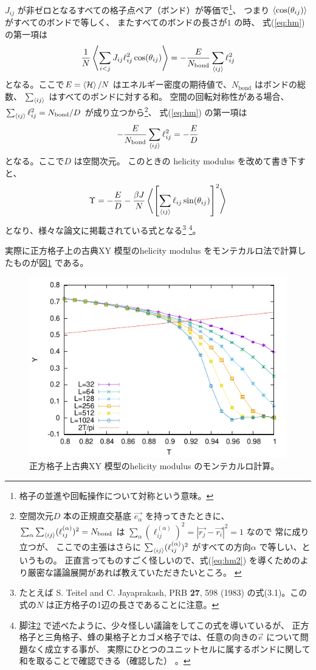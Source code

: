 \documentclass{jsarticle}
\begin{document}
$J_{ij}$ が非ゼロとなるすべての格子点ペア（ボンド）が等価で\footnote{格子の並進や回転操作について対称という意味。}、
つまり $\braket{\cos(\theta_{ij})}$ がすべてのボンドで等しく、
またすべてのボンドの長さが$1$ の時、
式(\ref{eq:hm}) の第一項は
\begin{equation}
  \frac{1}{N}\Braket{\sum_{i<j} J_{ij} \ell_{ij}^2 \cos(\theta_{ij})}
  =
  -\frac{E}{N_\text{bond}}\sum_{\braket{ij}}\ell_{ij}^2
\end{equation}
となる。ここで$E = \braket{\mathcal{H}}/N$ はエネルギー密度の期待値で、$N_\text{bond}$ はボンドの総数、
$\sum_{\braket{ij}}$ はすべてのボンドに対する和。
空間の回転対称性がある場合、$\sum_{\braket{ij}} \ell_{ij}^2 = N_\text{bond}/D$ が成り立つから\footnote{
  空間次元$D$ 本の正規直交基底 $\vec{e_\alpha}$ を持ってきたときに、
  $\sum_\alpha \sum_{\braket{ij}} (\ell_{ij}^{(\alpha)})^2 = N_\text{bond}$ は
  $\sum_\alpha (\ell_{ij}^{(\alpha)})^2 = \left|\vec{r_j}-\vec{r_i}\right|^2 = 1$ なので
  常に成り立つが、
  ここでの主張はさらに
  $\sum_{\braket{ij}} (\ell_{ij}^{(\alpha)})^2$ がすべての方向$\alpha$ で等しい、というもの。
  正直言ってものすごく怪しいので、式(\ref{eq:hm2}) を導くためのより厳密な議論展開があれば教えていただきたいところ。
  \label{fn:invD}
}、
式(\ref{eq:hm}) の第一項は
\begin{equation}
  -\frac{E}{N_\text{bond}}\sum_{\braket{ij}}\ell_{ij}^2
  =
  -\frac{E}{D}
\end{equation}
となる。ここで$D$ は空間次元。
このときの helicity modulus を改めて書き下すと、
\begin{equation}
  \Upsilon =
  -\frac{E}{D}
  -
  \frac{\beta J}{N}\Braket{\left[\sum_{\braket{ij}} \ell_{ij} \sin(\theta_{ij})\right]^2}
  \label{eq:hm2}
\end{equation}
となり、様々な論文に掲載されている式となる\footnote{
たとえば S. Teitel and C. Jayaprakash, PRB \textbf{27}, 598 (1983) の式(3.1)。この式の$N$ は正方格子の1辺の長さであることに注意。}
\footnote{
  脚注\ref{fn:invD} で述べたように、少々怪しい議論をしてこの式を導いているが、
  正方格子と三角格子、蜂の巣格子とカゴメ格子では、任意の向きの$\vec{e}$ について問題なく成立する事が、
  実際にひとつのユニットセルに属するボンドに関して和を取ることで確認できる（確認した） 。
}。

実際に正方格子上の古典XY 模型のhelicity modulus をモンテカルロ法で計算したものが図\ref{fig:hm} である。
\begin{figure}
  \includegraphics[width=\linewidth]{hm.pdf}
  \caption{正方格子上古典XY 模型のhelicity modulus のモンテカルロ計算。}
  \label{fig:hm}
\end{figure}
\end{document}
